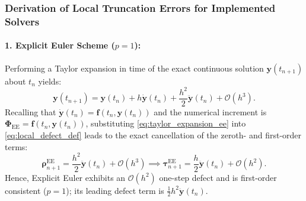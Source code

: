 \subsubsection{Derivation of Local Truncation Errors for Implemented Solvers}
\paragraph{1. Explicit Euler Scheme ($p=1$):}
Performing a Taylor expansion in time of the exact continuous solution $\mathbf{y}(t_{n+1})$ about $t_n$ yields:
\begin{equation}
\label{eq:taylor_expansion_ee}
\mathbf{y}(t_{n+1}) = \mathbf{y}(t_n) + h \dot{\mathbf{y}}(t_n) + \frac{h^2}{2} \ddot{\mathbf{y}}(t_n) + \mathcal{O}(h^3).
\end{equation}
Recalling that $\dot{\mathbf{y}}(t_n) = \mathbf{f}(t_n, \mathbf{y}(t_n))$ and the numerical increment is $\mathbf{\Phi}_{\text{EE}} = \mathbf{f}(t_n, \mathbf{y}(t_n))$, substituting \eqref{eq:taylor_expansion_ee} into \eqref{eq:local_defect_def} leads to the exact cancellation of the zeroth- and first-order terms:
\begin{equation}
\label{eq:euler_defect_expansion}
\boldsymbol{\rho}_{n+1}^{\text{EE}} = \frac{h^2}{2} \ddot{\mathbf{y}}(t_n) + \mathcal{O}(h^3) \implies \boldsymbol{\tau}_{n+1}^{\text{EE}} = \frac{h}{2} \ddot{\mathbf{y}}(t_n) + \mathcal{O}(h^2).
\end{equation}
Hence, Explicit Euler exhibits an $\mathcal{O}(h^2)$ one-step defect and is first-order consistent ($p=1$); its leading defect term is $\tfrac12 h^2\ddot{\mathbf{y}}(t_n)$.

